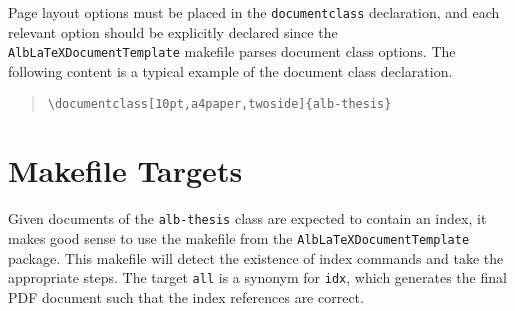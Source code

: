\documentclass[11pt,a4paper,oneside,titlepage]{alb-latex}
\begin{document}
Page layout options must be placed in the \texttt{documentclass}
declaration, and each relevant option should be explicitly declared
since the \texttt{AlbLaTeXDocumentTemplate} makefile parses document
class options.  The following content is a typical example of the
document class declaration.
\begin{quote}
\begin{verbatim}
\documentclass[10pt,a4paper,twoside]{alb-thesis}
\end{verbatim}
\end{quote}




\section{Makefile Targets}
\label{sec:alb-thesis:makef-targ}

Given documents of the \texttt{alb-thesis} class are expected to contain
an index, it makes good sense to use the makefile from the
\texttt{AlbLaTeXDocumentTemplate} package.  This makefile will detect
the existence of index commands and take the appropriate steps.  The
target \texttt{all} is a synonym for \texttt{idx}, which generates the
final PDF document such that the index references are correct.
\end{document}
